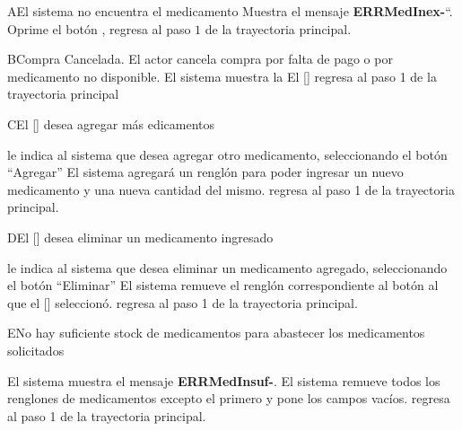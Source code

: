 		\begin{UCtrayectoriaA}{A}{El sistema no encuentra el medicamento}
			\UCpaso Muestra el mensaje {\bf ERRMedInex-}``.
			\UCpaso[\UCactor] Oprime el botón , regresa al paso $1$ de la trayectoria principal.  
		\end{UCtrayectoriaA}
		
	\begin{UCtrayectoriaA}{B}{Compra Cancelada.}
			\UCpaso[\UCactor]El actor cancela compra por falta de pago o por medicamento no disponible.
			\UCpaso El sistema muestra la \label{IUCompra}
			\UCpaso El [\UCactor] regresa al paso 1 de la trayectoria principal
		\end{UCtrayectoriaA}		
	\begin{UCtrayectoriaA}{C}{El [\UCactor] desea agregar m\'as edicamentos}
			
			\UCpaso[\UCactor] le indica al sistema que desea agregar otro medicamento, seleccionando el bot\'on "`Agregar"'
			\UCpaso El sistema agregar\'a un rengl\'on para poder ingresar un nuevo medicamento y una nueva cantidad del mismo.
				\UCpaso[\UCactor] regresa al paso 1 de la trayectoria principal.
		\end{UCtrayectoriaA}		
	\begin{UCtrayectoriaA}{D}{El [\UCactor] desea eliminar un medicamento ingresado}
			
			\UCpaso[\UCactor] le indica al sistema que desea eliminar un medicamento agregado, seleccionando el bot\'on "`Eliminar"'
			\UCpaso El sistema remueve el rengl\'on correspondiente al bot\'on al que el [\UCactor] seleccion\'o.
				\UCpaso[\UCactor] regresa al paso 1 de la trayectoria principal.
		\end{UCtrayectoriaA}
	\begin{UCtrayectoriaA}{E}{No hay suficiente stock de medicamentos para abastecer los medicamentos solicitados}
			
			\UCpaso El sistema muestra el mensaje {\bf ERRMedInsuf-}.
			\UCpaso El sistema remueve todos los renglones de medicamentos excepto el primero y pone los campos vac\'ios.
				\UCpaso[\UCactor] regresa al paso 1 de la trayectoria principal.
		\end{UCtrayectoriaA}
		
